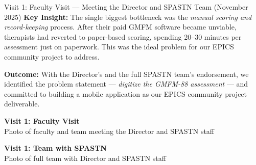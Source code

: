 \documentclass[11pt,a4paper]{article}
\begin{document}
\begin{visitbox}[visitblue]{Visit 1: Faculty Visit --- Meeting the Director and SPASTN Team (November 2025)}
\textbf{Key Insight:} The single biggest bottleneck was the \textit{manual scoring and record-keeping} process. After their paid GMFM software became unviable, therapists had reverted to paper-based scoring, spending 20--30 minutes per assessment just on paperwork. This was the ideal problem for our EPICS community project to address.

\textbf{Outcome:} With the Director's and the full SPASTN team's endorsement, we identified the problem statement --- \textit{digitize the GMFM-88 assessment} --- and committed to building a mobile application as our EPICS community project deliverable.

\vspace{0.3cm}
\begin{minipage}{0.48\textwidth}
    \begin{photoplaceholder}[height=4.5cm]
        \vspace{1.2cm}
        {\small\bfseries Visit 1: Faculty Visit}\\[0.2cm]
        {\footnotesize Photo of faculty and team meeting the Director and SPASTN staff}
    \end{photoplaceholder}
\end{minipage}
\hfill
\begin{minipage}{0.48\textwidth}
    \begin{photoplaceholder}[height=4.5cm]
        \vspace{1.2cm}
        {\small\bfseries Visit 1: Team with SPASTN}\\[0.2cm]
        {\footnotesize Photo of full team with Director and SPASTN staff}
    \end{photoplaceholder}
\end{minipage}

\end{visitbox}

\vspace{0.5cm}
\end{document}
